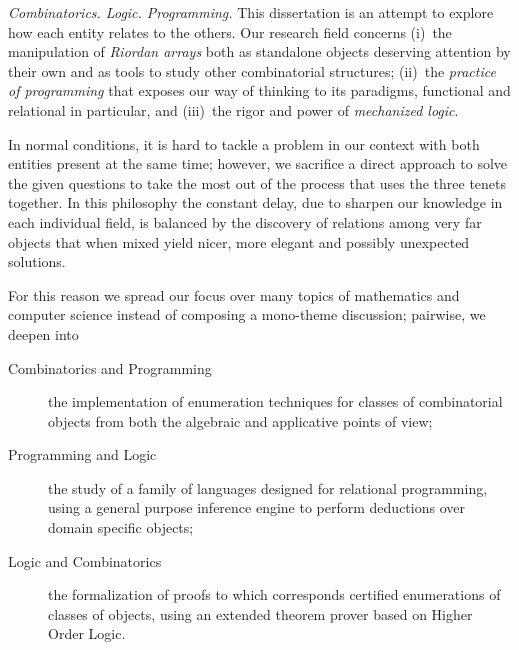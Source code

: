 


\textit{Combinatorics. Logic. Programming.} This dissertation is an attempt to
explore how each entity relates to the others. Our research field concerns
(i)~the manipulation of \textit{Riordan arrays} both as standalone objects
deserving attention by their own and as tools to study other combinatorial
structures; (ii)~the \textit{practice of programming} that exposes our way of 
thinking to its paradigms, functional and relational in particular, and 
(iii)~the rigor and power of \textit{mechanized logic}.

In normal conditions, it is hard to tackle a problem in our context with both
entities present at the same time; however, we sacrifice a direct approach to
solve the given questions to take the most out of the process that uses the
three tenets together. In this philosophy the constant delay, due to sharpen
our knowledge in each individual field, is balanced by the discovery of
relations among very far objects that when mixed yield nicer, more elegant and
possibly unexpected solutions.

For this reason we spread our focus over many topics of mathematics and
computer science instead of composing a mono-theme discussion; pairwise,
we deepen into
\begin{description}

    \item[Combinatorics and Programming] the implementation of enumeration
    techniques for classes of combinatorial objects from both the algebraic
    and applicative points of view;

    \item[Programming and Logic] the study of a family of languages designed
    for relational programming, using a general purpose inference engine to 
    perform deductions over domain specific objects;

    \item[Logic and Combinatorics] the formalization of proofs to which
    corresponds certified enumerations of classes of objects, using an extended
    theorem prover based on Higher Order Logic.

\end{description}


